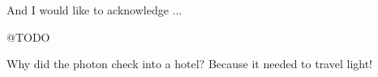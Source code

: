 
\begin{acknowledgements}


And I would like to acknowledge ...

@TODO

Why did the photon check into a hotel? Because it needed to travel light!


\end{acknowledgements}
